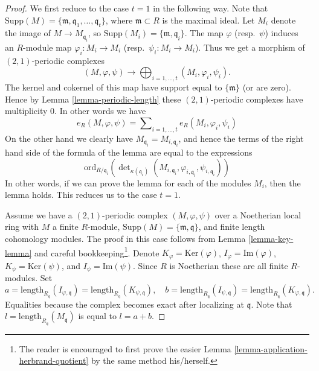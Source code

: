 \begin{proof}
We first reduce to the case $t = 1$ in the following way.
Note that
$\text{Supp}(M) = \{\mathfrak m, \mathfrak q_1, \ldots, \mathfrak q_t\}$,
where $\mathfrak m \subset R$ is the maximal ideal.
Let $M_i$ denote the image of $M \to M_{\mathfrak q_i}$,
so $\text{Supp}(M_i) = \{\mathfrak m, \mathfrak q_i\}$.
The map $\varphi$ (resp.\ $\psi$) induces an $R$-module map
$\varphi_i : M_i \to M_i$ (resp.\ $\psi_i : M_i \to M_i$).
Thus we get a morphism of $(2, 1)$-periodic complexes
$$
(M, \varphi, \psi) \longrightarrow
\bigoplus\nolimits_{i = 1, \ldots, t} (M_i, \varphi_i, \psi_i).
$$
The kernel and cokernel of this map have support equal to
$\{\mathfrak m\}$ (or are zero). Hence by Lemma \ref{lemma-periodic-length}
these $(2, 1)$-periodic complexes have multiplicity $0$.
In other words we have
$$
e_R(M, \varphi, \psi) =
\sum\nolimits_{i = 1, \ldots, t}
e_R(M_i, \varphi_i, \psi_i)
$$
On the other hand we clearly have $M_{\mathfrak q_i} = M_{i, \mathfrak q_i}$,
and hence the terms of the right hand side of the formula of the
lemma are equal to the expressions
$$
\text{ord}_{R/\mathfrak q_i}\left(
\det\nolimits_{\kappa(\mathfrak q_i)}
(M_{i, \mathfrak q_i}, \varphi_{i, \mathfrak q_i}, \psi_{i, \mathfrak q_i})
\right)
$$
In other words, if we can prove the lemma for each of the modules
$M_i$, then the lemma holds. This reduces us to the case $t = 1$.

\medskip\noindent
Assume we have a $(2, 1)$-periodic complex $(M, \varphi, \psi)$
over a Noetherian local ring with $M$ a finite $R$-module,
$\text{Supp}(M) = \{\mathfrak m, \mathfrak q\}$, and
finite length cohomology modules. The proof in this case
follows from Lemma \ref{lemma-key-lemma} and careful bookkeeping\footnote{
The reader is encouraged to first prove the easier
Lemma \ref{lemma-application-herbrand-quotient}
by the same method his/herself.}.
Denote
$K_\varphi = \text{Ker}(\varphi)$,
$I_\varphi = \text{Im}(\varphi)$,
$K_\psi = \text{Ker}(\psi)$, and
$I_\psi = \text{Im}(\psi)$.
Since $R$ is Noetherian these are all finite $R$-modules.
Set
$$
a = \text{length}_{R_{\mathfrak q}}(I_{\varphi, \mathfrak q})
= \text{length}_{R_{\mathfrak q}}(K_{\psi, \mathfrak q}),
\quad
b = \text{length}_{R_{\mathfrak q}}(I_{\psi, \mathfrak q})
= \text{length}_{R_{\mathfrak q}}(K_{\varphi, \mathfrak q}).
$$
Equalities because the complex becomes exact after localizing at
$\mathfrak q$. Note that $l = \text{length}_{R_{\mathfrak q}}(M_{\mathfrak q})$
is equal to $l = a + b$.


\end{proof}
